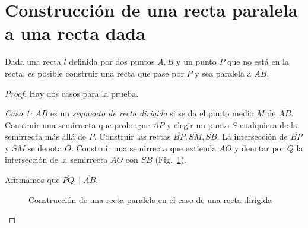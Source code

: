 \section{Construcción de una recta paralela a una recta dada}\label{s.parallel}

\begin{theorem}\label{thm.straight-parallel}
Dada una recta $l$ definida por dos puntos $A,B$ y un punto $P$ que no está en la recta, es posible construir una recta que pase por $P$ y sea paralela a $\overline{AB}$.
\end{theorem}

\begin{proof}

Hay dos casos para la prueba.

\textit{Caso 1:}
$\overline{AB}$ es un \emph{segmento de recta dirigida} si se da el punto medio $M$ de $\overline{AB}$.  Construir una semirrecta que prolongue $\overline{AP}$ y elegir un punto $S$ cualquiera de la semirrecta más allá de $P$. Construir las rectas $\overline{BP}, \overline{SM}, \overline{SB}$. La intersección de $\overline{BP}$ y $\overline{SM}$ se denota $O$. Construir una semirrecta que extienda $\overline{AO}$ y denotar por $Q$ la intersección de la semirrecta $\overline{AO}$ con $\overline{SB}$ (Fig.~\ref{f.se-parallel-directed}).

Afirmamos que $\overline{PQ}\parallel \overline{AB}$. 

\begin{figure}[ht]
\begin{center}
\end{center}
\caption{Construcción de una recta paralela en el caso de una recta dirigida}\label{f.se-parallel-directed}
\end{figure}


\end{proof}
